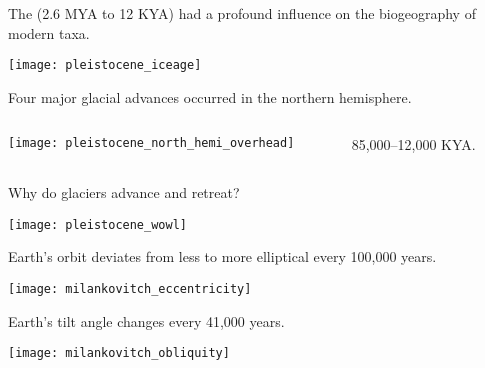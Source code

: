 \documentclass[t]{beamer}
\begin{document}

\begin{frame}{The  (2.6 MYA to 12 KYA) had a profound influence on the biogeography of modern taxa.}
	\begin{center}
			\texttt{[image: pleistocene\_iceage]}
			
	\end{center}
\end{frame}

\begin{frame}{Four major glacial advances occurred in the northern hemisphere.}
	\begin{columns}[T]
		\begin{column}{0.45\textwidth}
			\texttt{[image: pleistocene\_north\_hemi\_overhead]}
		\end{column}
		\begin{column}{0.45\textwidth}
			\hangpara{}
			
			\hangpara{}
			
			\hangpara{}
			
			\hangpara{} 85,000–12,000 KYA.
			
		\end{column}
	\end{columns}
\end{frame}


\begin{frame}{Why do glaciers advance and retreat?}
	\begin{center}
		\texttt{[image: pleistocene\_wowl]}
	\end{center}
\end{frame}

\begin{frame}{ Earth’s orbit deviates from less to more elliptical every 100,000 years.}
	\begin{center}
		\texttt{[image: milankovitch\_eccentricity]}
	\end{center}
\end{frame}

\begin{frame}{ Earth’s tilt angle changes every 41,000 years.}
	\begin{center}
		\texttt{[image: milankovitch\_obliquity]}
	\end{center}
\end{frame}
\end{document}
